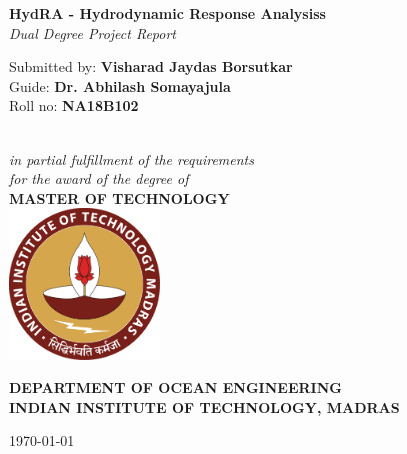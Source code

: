 \begin{titlepage}
\centering
\setlength{\droptitle}{-4em} 

{\huge \bfseries HydRA - Hydrodynamic Response Analysiss} %
\\ [1.5cm]


\emph{\large Dual Degree Project Report } %
\\[1cm] 

\begin{minipage}{1\textwidth}
\begin{center} \large
Submitted by: \textbf{Visharad Jaydas Borsutkar} %
\\
Guide: \textbf{Dr. Abhilash Somayajula} \\
Roll no: \textbf{NA18B102} %
\end{center}
\end{minipage} 
\\[2cm]

\emph{\large in partial fulfillment of the requirements \\ for the award of the degree of }
\\ [2cm]


{\large \bf MASTER OF TECHNOLOGY}
\\[2cm]


\includegraphics[width=4cm]{photos/logo.pdf}


\vspace{0.5cm}
\begin{minipage}{1\textwidth}
\begin{center} \large
\textbf {DEPARTMENT OF OCEAN ENGINEERING \\
INDIAN INSTITUTE OF TECHNOLOGY, MADRAS} %
\\[0.3cm]

\end{center}
\end{minipage} 

\vspace{1cm}
{\large \today}
\end{titlepage}
